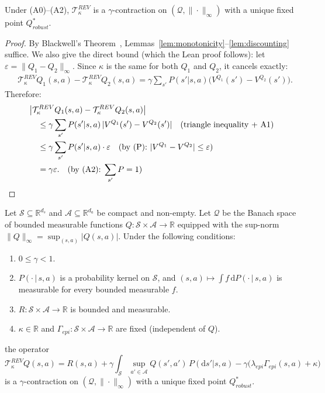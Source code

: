 \begin{theorem}
    \label{thm:contraction}
    Under (A0)--(A2), $\mathcal{T}^{REV}_\kappa$ is a $\gamma$-contraction on $(\mathcal{Q}, \|\cdot\|_\infty)$ with a unique fixed point $Q^*_{robust}$.
\end{theorem}
\begin{proof}
By Blackwell's Theorem~\cite{Blackwell1965DiscountedDP}, Lemmas~\ref{lem:monotonicity}--\ref{lem:discounting} suffice.
We also give the direct bound (which the Lean proof follows):
let $\varepsilon = \|Q_1 - Q_2\|_\infty$.
Since $\kappa$ is the same for both $Q_1$ and $Q_2$, it cancels exactly:
\begin{align}
    &\mathcal{T}^{REV}_\kappa Q_1(s,a) - \mathcal{T}^{REV}_\kappa Q_2(s,a)
    = \gamma \sum_{s'} P(s'|s,a)\bigl(V^{Q_1}(s') - V^{Q_2}(s')\bigr).
\end{align}
Therefore:
\begin{align}
    &\bigl|\mathcal{T}^{REV}_\kappa Q_1(s,a) - \mathcal{T}^{REV}_\kappa Q_2(s,a)\bigr| \notag\\
    &\quad \le \gamma \sum_{s'} P(s'|s,a)\,|V^{Q_1}(s') - V^{Q_2}(s')|
        \quad\text{(triangle inequality + A1)} \notag\\
    &\quad \le \gamma \sum_{s'} P(s'|s,a) \cdot \varepsilon
        \quad\text{(by (P): $|V^{Q_1}-V^{Q_2}|\le\varepsilon$)} \notag\\
    &\quad = \gamma\varepsilon.
        \quad\text{(by (A2): $\sum_{s'} P = 1$)} \qedhere
\end{align}
\end{proof}

\begin{theorem}
\label{thm:continuous}
Let $\mathcal{S}\subseteq\mathbb{R}^{d_s}$ and $\mathcal{A}\subseteq\mathbb{R}^{d_a}$ be compact and non-empty.
Let $\mathcal{Q}$ be the Banach space of bounded measurable functions $Q:\mathcal{S}\times\mathcal{A}\to\mathbb{R}$ equipped with the sup-norm $\|Q\|_\infty = \sup_{(s,a)}|Q(s,a)|$.
Under the following conditions:
\begin{enumerate}
    \item[\textbf{(C0)}] $0\le\gamma<1$.
    \item[\textbf{(C1)}] $P(\cdot\,|\,s,a)$ is a probability kernel on $\mathcal{S}$, and $(s,a)\mapsto\int f\,\mathrm{d}P(\cdot\,|\,s,a)$ is measurable for every bounded measurable $f$.
    \item[\textbf{(C2)}] $R:\mathcal{S}\times\mathcal{A}\to\mathbb{R}$ is bounded and measurable.
    \item[\textbf{(C3)}] $\kappa\in\mathbb{R}$ and $\Gamma_{epi}:\mathcal{S}\times\mathcal{A}\to\mathbb{R}$ are fixed (independent of $Q$).
\end{enumerate}
the operator
\begin{equation}
    \mathcal{T}^{REV}_\kappa Q(s,a) = R(s,a) + \gamma\!\int_\mathcal{S}\!\sup_{a'\in\mathcal{A}}Q(s',a')\,P(\mathrm{d}s'|s,a)
    - \gamma\bigl(\lambda_{epi}\Gamma_{epi}(s,a)+\kappa\bigr)
\end{equation}
is a $\gamma$-contraction on $(\mathcal{Q},\|\cdot\|_\infty)$ with a unique fixed point $Q^*_{robust}$.
\end{theorem}

